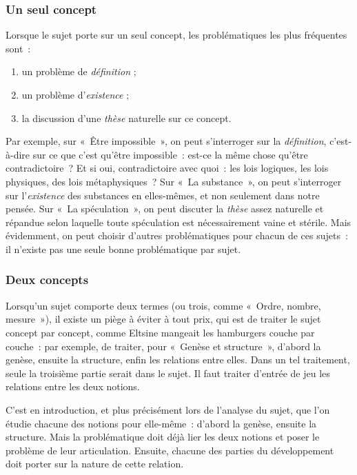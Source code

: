 \documentclass[a4paper]{article}
\begin{document}
\subsubsection{Un seul concept}
\label{sec-3-1-1}


Lorsque le sujet porte sur un seul concept, les problématiques les plus
fréquentes sont :

\begin{enumerate}
\item un problème de \emph{définition} ;
\item un problème d'\emph{existence} ;
\item la discussion d'une \emph{thèse} naturelle sur ce concept.
\end{enumerate}

Par exemple, sur « Être impossible », on peut s'interroger sur la
\emph{définition}, c'est-à-dire sur ce que c'est qu'être impossible : est-ce
la même chose qu'être contradictoire ? Et si oui, contradictoire avec
quoi : les lois logiques, les lois physiques, des lois métaphysiques ?
Sur « La substance », on peut s'interroger sur l'\emph{existence} des
substances en elles-mêmes, et non seulement dans notre pensée. Sur « La
spéculation », on peut discuter la \emph{thèse} assez naturelle et répandue
selon laquelle toute spéculation est nécessairement vaine et stérile.
Mais évidemment, on peut choisir d'autres problématiques pour chacun de
ces sujets : il n'existe pas une seule bonne problématique par sujet.
\subsubsection{Deux concepts}
\label{sec-3-1-2}


Lorsqu'un sujet comporte deux termes (ou trois, comme « Ordre, nombre,
mesure »), il existe un piège à éviter à tout prix, qui est de traiter le
sujet concept par concept, comme Eltsine mangeait les hamburgers couche
par couche : par exemple, de traiter, pour « Genèse et structure »,
d'abord la genèse, ensuite la structure, enfin les relations entre
elles. Dans un tel traitement, seule la troisième partie serait dans le
sujet. Il faut traiter d'entrée de jeu les relations entre les deux
notions.

C'est en introduction, et plus précisément lors de l'analyse du sujet,
que l'on étudie chacune des notions pour elle-même : d'abord la genèse,
ensuite la structure. Mais la problématique doit déjà lier les deux
notions et poser le problème de leur articulation. Ensuite, chacune des
parties du développement doit porter sur la nature de cette relation.
\end{document}
